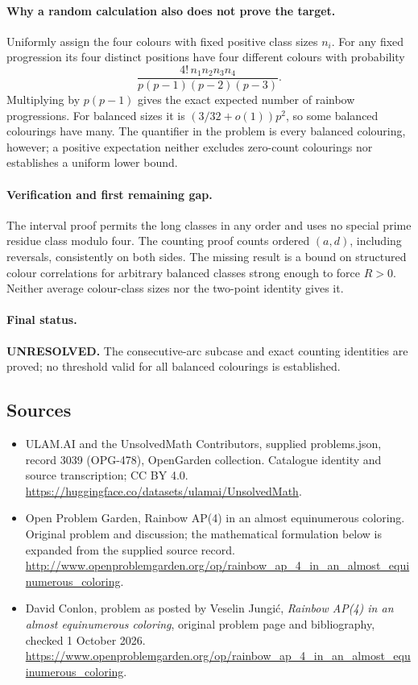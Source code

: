 \documentclass[11pt,a4paper]{article}
\begin{document}
\paragraph{Why a random calculation also does not prove the target.}
Uniformly assign the four colours with fixed positive class sizes $n_i$.
For any fixed progression its four distinct positions have four
different colours with probability
\[
 \frac{4!\,n_1n_2n_3n_4}{p(p-1)(p-2)(p-3)}.
\]
Multiplying by $p(p-1)$ gives the exact expected number of rainbow
progressions. For balanced sizes it is $(3/32+o(1))p^2$, so some
balanced colourings have many. The quantifier in the problem is every
balanced colouring, however; a positive expectation neither excludes
zero-count colourings nor establishes a uniform lower bound.

\paragraph{Verification and first remaining gap.}
The interval proof permits the long classes in any order and uses no
special prime residue class modulo four. The counting proof counts
ordered $(a,d)$, including reversals, consistently on both sides.
The missing result is a bound on structured colour correlations for
arbitrary balanced classes strong enough to force $R>0$. Neither
average colour-class sizes nor the two-point identity gives it.

\paragraph{Final status.}
\textbf{UNRESOLVED.} The consecutive-arc subcase and exact counting
identities are proved; no threshold valid for all balanced colourings
is established.

\subsection{Sources}
\begin{itemize}
\item[S1] ULAM.AI and the UnsolvedMath Contributors, supplied problems.json, record 3039 (OPG-478), OpenGarden collection. Catalogue identity and source transcription; CC BY 4.0.
\url{https://huggingface.co/datasets/ulamai/UnsolvedMath}.
\item[S2] Open Problem Garden, Rainbow AP(4) in an almost equinumerous coloring. Original problem and discussion; the mathematical formulation below is expanded from the supplied source record.
\url{http://www.openproblemgarden.org/op/rainbow_ap_4_in_an_almost_equinumerous_coloring}.

\item[R1] David Conlon, problem as posted by Veselin Jungi\'c,
\emph{Rainbow AP(4) in an almost equinumerous coloring}, original
problem page and bibliography, checked 1 October 2026.
\url{https://www.openproblemgarden.org/op/rainbow_ap_4_in_an_almost_equinumerous_coloring}.

\end{itemize}
\end{document}
